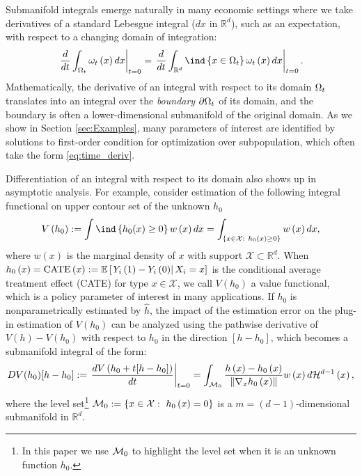 \documentclass[12pt,american]{article}
\theoremstyle{definition}
\theoremstyle{plain}
\theoremstyle{definition}
\theoremstyle{plain}
\theoremstyle{plain}
\theoremstyle{plain}
\theoremstyle{plain}
\theoremstyle{plain}
\newcommand{\R}{\mathbb{R}}
\newcommand{\E}{\mathbb{E}}
\newcommand{\norm}[1]{\left\| #1 \right\|}
\begin{document}
Submanifold integrals emerge naturally in many economic  settings where we take derivatives of a standard Lebesgue integral ($dx$ in $\R^d$),
such as an expectation, with respect to a changing domain of integration:
\begin{equation}
  \rest{\frac{d}{dt}\int_{\O_{t}}\omega_{t}\left(x\right)dx}_{t=0}=\rest{\frac{d}{dt}\int_{\R^d}\ind\left\{ x\in \O_{t}\right\}\omega_{t}\left(x\right)dx}_{t=0}.\label{eq:time_deriv}
\end{equation}
Mathematically, the derivative of an integral with respect
to its domain $\Omega_{t}$ translates into an integral over the \emph{boundary} $\partial\Omega_t$ of its domain, and the boundary is often a lower-dimensional submanifold of the original domain. As we show in Section \ref{sec:Examples}, many parameters of interest are identified by solutions to first-order condition for optimization over subpopulation, which often take the form \eqref{eq:time_deriv}.  %

Differentiation of an integral with respect to its domain also shows
up in asymptotic analysis. For example, consider estimation of the following integral functional on upper contour set of the unknown $h_0$
\begin{equation}
  V\left(h_{0}\right):=\int \ind\left\{ h_{0}(x)\geq0\right\}w\left(x\right)dx=\int_{\left\{x\in \mathcal{X}:~ h_{0}(x)\geq0\right\} }w\left(x\right)dx,\label{eq:WFB}
\end{equation}
where $w(x)$ is the marginal density of $x$ with support $\mathcal{X}\subset \R^d$. When $h_{0}\left(x\right)=\text{CATE}\left(x\right):=\E\left[\rest{Y_{i}\left(1\right)-Y_{i}\left(0\right)}X_{i}=x\right]$
is the conditional average treatment effect (CATE) for type $x \in \mathcal{X}$, we call $V\left(h_{0}\right)$ a value functional, which is a policy parameter of interest in many applications.
If $h_{0}$ is nonparametrically estimated by $\hat{h}$, the impact of the estimation error
on the plug-in estimation of $V(h_{0})$ can be analyzed using the
pathwise derivative of $V(h)-V(h_{0})$ with respect to $h_0$ in the direction $[h-h_{0}]$, which
becomes a submanifold integral of the form:
\[
  DV(h_0)[h-h_0]:=\rest{\frac{dV\left(h_0 +t[h-h_0]\right)}{dt}}_{t=0}=\int_{\mathcal{M}_0}\frac{h\left(x\right)-h_{0}\left(x\right)}{\norm{\Dif_{x}h_{0}\left(x\right)}}w\left(x\right)d{\cal H}^{d-1}\left(x\right),
\]
where the level set\footnote{In this paper we use ${\cal M}_0$ to highlight the level set when it is an unknown function $h_0$.} ${\cal M}_0:=\{x\in \mathcal{X}:~ h_{0}\left(x\right)=0\}$ is a
$m=(d-1)$-dimensional submanifold in $\R^{d}$.
\end{document}

